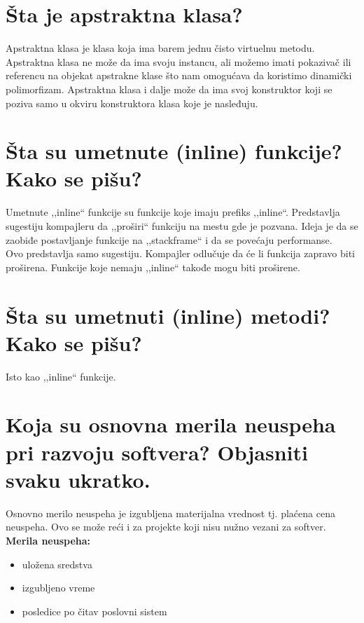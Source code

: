 \documentclass[a4paper]{article}
\begin{document}
\section{Šta je apstraktna klasa?}
  Apstraktna klasa je klasa koja ima barem jednu čisto virtuelnu metodu. Apstraktna klasa ne može da
  ima svoju instancu, ali možemo imati pokazivač ili referencu na objekat apstrakne klase što nam
  omogućava da koristimo dinamički polimorfizam. Apstraktna klasa i dalje može da ima svoj konstruktor
  koji se poziva samo u okviru konstruktora klasa koje je nasleđuju.

\section{Šta su umetnute (inline) funkcije? Kako se pišu?}
  Umetnute ,,inline`` funkcije su funkcije koje imaju prefiks ,,inline``. Predstavlja sugestiju kompajleru
  da ,,proširi`` funkciju na mestu gde je pozvana. Ideja je da se zaobiđe postavljanje funkcije
  na ,,stackframe`` i da se povećaju performanse. \\
  \indent Ovo predstavlja samo sugestiju. Kompajler odlučuje da će li funkcija zapravo biti proširena. 
  Funkcije koje nemaju ,,inline`` takođe mogu biti proširene.

\section{Šta su umetnuti (inline) metodi? Kako se pišu?}
  Isto kao ,,inline`` funkcije.
  
\section{Koja su osnovna merila neuspeha pri razvoju softvera? Objasniti svaku ukratko.}
  Osnovno merilo neuspeha je izgubljena materijalna vrednost tj. plaćena cena neuspeha. Ovo se
  može reći i za projekte koji nisu nužno vezani za softver. \\
  \textbf{Merila neuspeha:}
  \begin{itemize}
    \item uložena sredstva 
    \item izgubljeno vreme 
    \item posledice po čitav poslovni sistem 
  \end{itemize}
\end{document}

